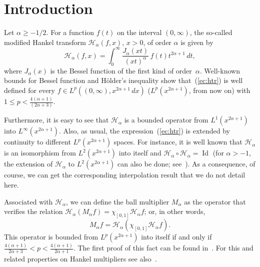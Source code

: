 \documentclass{amsart}
\theoremstyle{remark}
\newcommand{\iden}{\operatorname{Id}}
\newcommand{\htr}{\mathcal{H}_{\alpha}}
\newcommand{\ma}{M_{\alpha}}
\begin{document}
\section{Introduction}

Let $\alpha\ge-1/2$. For a function $f(t)$ on the interval $(0,\infty)$,
the so-called modified Hankel transform $\htr(f,x)$, $x>0$, of order $\alpha$
is given by
\begin{equation}
\label{ec:htr}
    \htr(f,x) = \int_0^\infty \frac{J_\alpha(xt)}{(xt)^\alpha} \, f(t)
      t^{2\alpha+1} \, dt,
\end{equation}
where $J_\alpha(x)$ is the Bessel function of the first kind of order~$\alpha$.
Well-known bounds for Bessel function and H\"older's inequality
show that~(\ref{ec:htr}) is well defined for every
$f\in L^p((0,\infty),x^{2\alpha+1}\,dx)$
($L^p(x^{2\alpha+1})$, from now on) with
$1 \le p < \frac{4(\alpha+1)}{(2\alpha+3)}$.

Furthermore, it is easy to see that $\htr$ is a bounded
operator from $L^1(x^{2\alpha+1})$ into $L^\infty(x^{2\alpha+1})$. Also, as
usual, the expression~(\ref{ec:htr}) is extended by continuity to different
$L^p(x^{2\alpha+1})$ spaces. For instance, it is well known that $\htr$ is an
isomorphism from $L^2(x^{2\alpha+1})$ into itself and $\htr \circ \htr =
\iden$ (for $\alpha>-1$, the extension of $\htr$ to $L^2(x^{2\alpha+1})$ can
also be done; see~\cite{Dur1,Dur2,Var,BeStem}). As a consequence, of course,
we can get the corresponding interpolation result that we do not detail here.

Associated with $\htr$, we can define the ball multiplier $\ma$ as the
operator that verifies the relation $\htr(\ma f) = \chi_{[0,1]}\htr f$; or,
in other words,
\begin{equation*}
    \ma f = \htr(\chi_{[0,1]}\htr f).
\end{equation*}
This operator is bounded from $L^p(x^{2\alpha+1})$ into itself if and only
if $\frac{4(\alpha+1)}{2\alpha+3} < p < \frac{4(\alpha+1)}{2\alpha+1}$.
The first proof of this fact can be found in~\cite{Her}. For this and related
properties on Hankel multipliers see
also~\cite{Iga,GasTr,Var,StemTr,GPV-Con,CGPV-FN,CGPV-DIE}.
\end{document}
